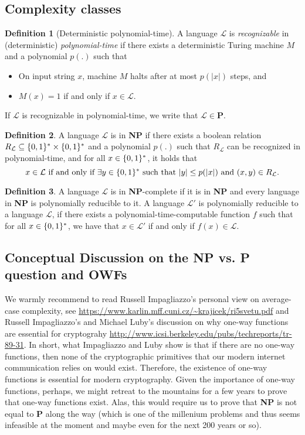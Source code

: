 \documentclass[a4paper,table,dvipsnames]{article}
\theoremstyle{definition}
\newtheorem{definition}{Definition}[section]
\begin{document}
\subsection{Complexity classes}\label{subsec:complexityclasses}
\begin{definition}[Deterministic polynomial-time]
A language $\mathcal{L}$ is \emph{recognizable} in (deterministic) \emph{polynomial-time} if there exists a deterministic Turing machine $M$ and a polynomial $p(.)$ such that
\begin{itemize}
\item On input string $x$, machine $M$ halts after at most $p(|x|)$ steps, and
\item $M(x)=1$ if and only if $x\in\mathcal{L}$.
\end{itemize}
\end{definition}
If $\mathcal{L}$ is recognizable in polynomial-time, we write that $\mathcal{L}\in\textbf{P}$.
\begin{definition}
A language $\mathcal{L}$ is in \textbf{NP} if there exists a boolean relation $R_{\mathcal{L}}\subseteq\{0,1\}^*\times\{0,1\}^*$ and a polynomial $p(.)$ such that $R_{\mathcal{L}}$ can be recognized in polynomial-time, and for all $x\in\{0,1\}^*$, it holds that
\[x\in\mathcal{L}\text{ if and only if } \exists y\in\bin^*\text{ such that }\abs{y}\leq p(\abs{x})\text{ and }(x,y)\in R_{\mathcal{L}}.\]
\end{definition}
\begin{definition}
A language $\mathcal{L}$ is in \textbf{NP}-complete if it is in \textbf{NP} and every language in \textbf{NP} is polynomially reducible to it. A language $\mathcal{L'}$ is polynomially reducible to a language $\mathcal{L}$, if there exists a polynomial-time-computable function $f$ such that for all $x\in\{0,1\}^*$, we have that $x\in\mathcal{L'}$ if and only if $f(x)\in\mathcal{L}$.
\end{definition}

\subsection{Conceptual Discussion on the \textbf{NP} vs. \textbf{P} question and OWFs}
We warmly recommend to read Russell Impagliazzo's personal view on average-case complexity, see \url{https://www.karlin.mff.cuni.cz/~krajicek/ri5svetu.pdf} and Russell Impagliazzo's and Michael Luby's discussion on why one-way functions are essential for cryptograhy \url{http://www.icsi.berkeley.edu/pubs/techreports/tr-89-31}. In short, what Impagliazzo and Luby show is that if there are no one-way functions, then none of the cryptographic primitives that our modern internet communication relies on would exist. Therefore, the existence of one-way functions is essential for modern cryptography. Given the importance of one-way functions, perhaps, we might retreat to the mountains for a few years to prove that one-way functions exist. Alas, this would require us to prove that \textbf{NP} is not equal to \textbf{P} along the way (which is one of the millenium problems and thus seems infeasible at the moment and maybe even for the next 200 years or so).
\end{document}
